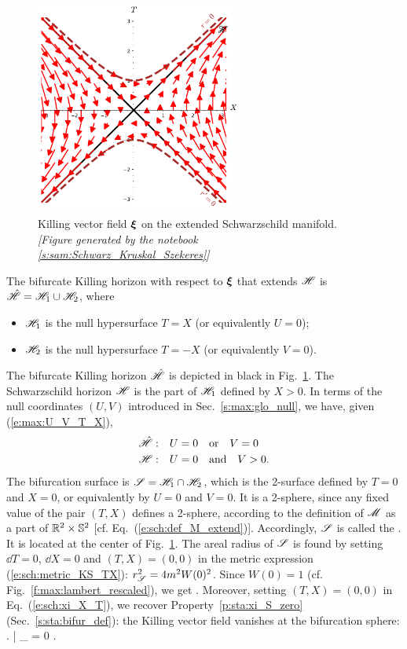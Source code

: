 \begin{figure}
\centerline{\includegraphics[width=0.6\textwidth]{max_xi_extend.pdf}}
\caption[]{\label{f:sch:xi_extend} \footnotesize
Killing vector field $\bm{\xi}$ on the extended Schwarzschild manifold.
\textsl{[Figure generated by the notebook \ref{s:sam:Schwarz_Kruskal_Szekeres}]}
}
\end{figure}

The bifurcate Killing horizon with respect to $\bm{\xi}$
that extends $\mathscr{H}$
is $\hat{\mathscr{H}} = \mathscr{H}_1 \cup \mathscr{H}_2 $, where
\begin{itemize}
\item $\mathscr{H}_1$ is the null hypersurface $T=X$ (or equivalently $U=0$);
\item $\mathscr{H}_2$ is the null hypersurface $T=-X$ (or equivalently $V=0$).
\end{itemize}
The bifurcate Killing horizon $\hat{\mathscr{H}}$ is depicted in black in
Fig.~\ref{f:sch:xi_extend}.
The Schwarzschild horizon $\mathscr{H}$ is the part of $\mathscr{H}_1$ defined by $X>0$.
In terms of the null coordinates $(U,V)$ introduced in Sec.~\ref{s:max:glo_null},
we have, given (\ref{e:max:U_V_T_X}),
\begin{subequations}
\label{e:max:Hor_U_V}
\begin{align}
    \hat{\mathscr{H}}:\quad&  U = 0 \quad\mbox{or}\quad V = 0 \\
    \mathscr{H}:\quad &   U = 0 \quad\mbox{and}\quad V > 0 .
\end{align}
\end{subequations}
The bifurcation surface is $\mathscr{S} = \mathscr{H}_1 \cap \mathscr{H}_2$, which
is the 2-surface defined by $T=0$ and $X=0$, or equivalently by
$U=0$ and $V=0$. It is a 2-sphere, since
any fixed value of the pair $(T,X)$ defines a 2-sphere, according to the
definition of $\mathscr{M}$ as a part of $\mathbb{R}^2\times\mathbb{S}^2$
[cf. Eq.~(\ref{e:sch:def_M_extend})]. Accordingly, $\mathscr{S}$ is called the
. It is located at the
center of Fig.~\ref{f:sch:xi_extend}.
The areal radius of $\mathscr{S}$ is found by setting
$\dd T = 0$, $\dd X = 0$ and $(T,X)=(0,0)$ in the metric expression
(\ref{e:sch:metric_KS_TX}): $r_{\mathscr{S}}^2 = 4m^2 W(0)^2$.
Since $W(0)=1$ (cf. Fig.~\ref{f:max:lambert_rescaled}), we get
\be
     .
\ee
Moreover, setting $(T,X)=(0,0)$ in Eq.~(\ref{e:sch:xi_X_T}),
we recover Property~\ref{p:sta:xi_S_zero} (Sec.~\ref{s:sta:bifur_def}): the Killing
vector field vanishes at the bifurcation sphere:
\be
\left. \w{\xi} \right| _{\Sp} = 0 .
\ee


